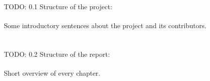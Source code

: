 TODO: 0.1 Structure of the project: \\
\\
Some introductory sentences about the project and its contributors. \\
\\
\\
TODO: 0.2 Structure of the report: \\
\\
Short overview of every chapter.